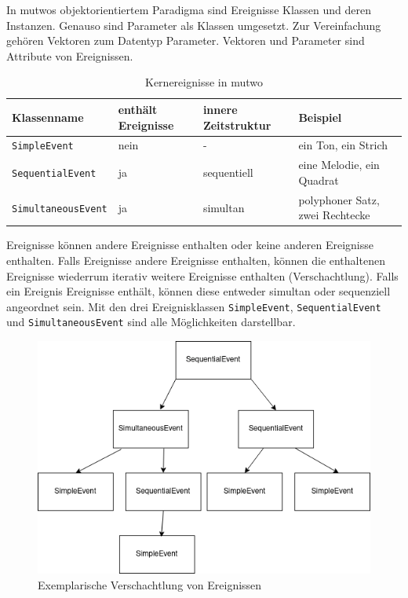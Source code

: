 \documentclass[12pt,a4paper,ngerman]{article}
\begin{document}
In mutwos objektorientiertem Paradigma sind Ereignisse Klassen und deren Instanzen.
Genauso sind Parameter als Klassen umgesetzt.
Zur Vereinfachung gehören Vektoren zum Datentyp Parameter.
Vektoren und Parameter sind Attribute von Ereignissen.

\begin{table}[h!]
    \begin{center}
        \begin{tabular}{l l l l} 
            \hline
            Klassenname & enthält Ereignisse & innere Zeitstruktur & Beispiel \\ [0.5ex] 
            \hline\hline
            \texttt{SimpleEvent} & nein & - & ein Ton, ein Strich \\ 
            \texttt{SequentialEvent} & ja & sequentiell & eine Melodie, ein Quadrat \\ 
            \texttt{SimultaneousEvent} & ja & simultan & polyphoner Satz, zwei Rechtecke \\ [1ex] 
            \hline
        \end{tabular}
    \end{center}

    \caption{Kernereignisse in mutwo}
\end{table}

Ereignisse können andere Ereignisse enthalten oder keine anderen Ereignisse enthalten.
Falls Ereignisse andere Ereignisse enthalten, können die enthaltenen Ereignisse wiederrum iterativ weitere Ereignisse enthalten (Verschachtlung).
Falls ein Ereignis Ereignisse enthält, können diese entweder simultan oder sequenziell angeordnet sein.
Mit den drei Ereignisklassen \texttt{SimpleEvent}, \texttt{SequentialEvent} und \texttt{SimultaneousEvent} sind alle Möglichkeiten darstellbar.

\begin{figure}[h!]
    \begin{center}
        \includegraphics[scale=0.5]{pictures/nested_event.png}

        \caption{Exemplarische Verschachtlung von Ereignissen}
    \end{center}
\end{figure}
\end{document}
